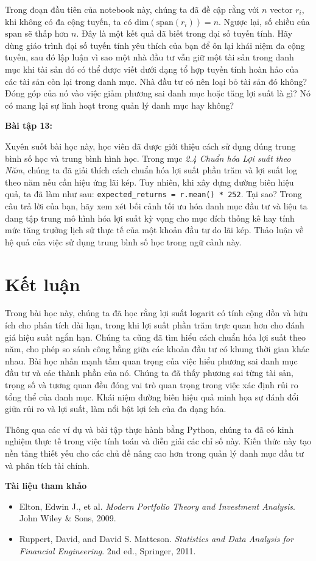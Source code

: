 Trong đoạn đầu tiên của notebook này, chúng ta đã đề cập rằng với $n$ vector $r_{i}$, khi không có đa cộng tuyến, ta có $\text{dim}(\text{span}(r_{i})) = n$. Ngược lại, số chiều của $\text{span}$ sẽ thấp hơn $n$. Đây là một kết quả đã biết trong đại số tuyến tính. Hãy dùng giáo trình đại số tuyến tính yêu thích của bạn để ôn lại khái niệm đa cộng tuyến, sau đó lập luận vì sao một nhà đầu tư vẫn giữ một tài sản trong danh mục khi tài sản đó có thể được viết dưới dạng tổ hợp tuyến tính hoàn hảo của các tài sản còn lại trong danh mục. Nhà đầu tư có nên loại bỏ tài sản đó không? Đóng góp của nó vào việc giảm phương sai danh mục hoặc tăng lợi suất là gì? Nó có mang lại sự linh hoạt trong quản lý danh mục hay không?

\textbf{Bài tập 13:}

Xuyên suốt bài học này, học viên đã được giới thiệu cách sử dụng đúng trung bình số học và trung bình hình học. Trong mục \emph{2.4 Chuẩn hóa Lợi suất theo Năm}, chúng ta đã giải thích cách chuẩn hóa lợi suất phần trăm và lợi suất log theo năm nếu cần hiệu ứng lãi kép. Tuy nhiên, khi xây dựng đường biên hiệu quả, ta đã làm như sau: \texttt{expected\_returns = r.mean() * 252}. Tại sao? Trong câu trả lời của bạn, hãy xem xét bối cảnh tối ưu hóa danh mục đầu tư và liệu ta đang tập trung mô hình hóa lợi suất kỳ vọng cho mục đích thống kê hay tính mức tăng trưởng lịch sử thực tế của một khoản đầu tư do lãi kép. Thảo luận về hệ quả của việc sử dụng trung bình số học trong ngữ cảnh này.

\section{Kết luận}

Trong bài học này, chúng ta đã học rằng lợi suất logarit có tính cộng dồn và hữu ích cho phân tích dài hạn, trong khi lợi suất phần trăm trực quan hơn cho đánh giá hiệu suất ngắn hạn. Chúng ta cũng đã tìm hiểu cách chuẩn hóa lợi suất theo năm, cho phép so sánh công bằng giữa các khoản đầu tư có khung thời gian khác nhau.
Bài học nhấn mạnh tầm quan trọng của việc hiểu phương sai danh mục đầu tư và các thành phần của nó. Chúng ta đã thấy phương sai từng tài sản, trọng số và tương quan đều đóng vai trò quan trọng trong việc xác định rủi ro tổng thể của danh mục. Khái niệm đường biên hiệu quả minh họa sự đánh đổi giữa rủi ro và lợi suất, làm nổi bật lợi ích của đa dạng hóa.

Thông qua các ví dụ và bài tập thực hành bằng Python, chúng ta đã có kinh nghiệm thực tế trong việc tính toán và diễn giải các chỉ số này. Kiến thức này tạo nền tảng thiết yếu cho các chủ đề nâng cao hơn trong quản lý danh mục đầu tư và phân tích tài chính.

\textbf{Tài liệu tham khảo}

\begin{itemize}
  \item Elton, Edwin J., et al. \emph{Modern Portfolio Theory and Investment Analysis}. John Wiley \& Sons, 2009.
  \item Ruppert, David, and David S. Matteson. \emph{Statistics and Data Analysis for Financial Engineering}. 2nd ed., Springer, 2011.
\end{itemize}
